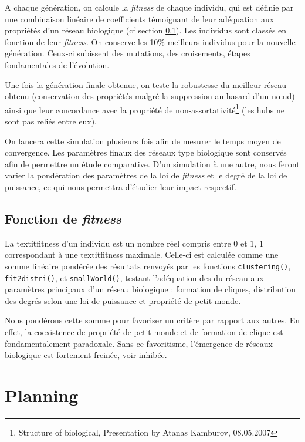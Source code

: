 A chaque génération, on calcule la \textit{fitness} de chaque individu, qui est définie par une combinaison linéaire de coefficients témoignant de leur adéquation aux propriétés d'un réseau biologique (cf section \ref{fitness}).
Les individus sont classés en fonction de leur \textit{fitness}. On conserve les 10\% meilleurs individus pour la nouvelle génération. Ceux-ci subissent des mutations, des croisements, étapes fondamentales de l'évolution.

Une fois la génération finale obtenue, on teste la robustesse du meilleur réseau obtenu (conservation des propriétés malgré la suppression au hasard d'un nœud) ainsi que leur concordance avec la propriété de non-assortativité\footnote{Structure of biological, Presentation by Atanas Kamburov, 08.05.2007} (les hubs ne sont pas reliés entre eux).

On lancera cette simulation plusieurs fois afin de mesurer le temps moyen de convergence.
Les paramètres finaux des réseaux type \og biologique \fg sont conservés afin de permettre un étude comparative. D'un simulation à une autre, nous feront varier la pondération des paramètres de la loi de \textit{fitness} et le degré de la loi de puissance, ce qui nous permettra d'étudier leur impact respectif.

\subsection{Fonction de \textit{fitness}}
\label{fitness}
La textit{fitness} d'un individu est un nombre réel compris entre $0$ et $1$, $1$ correspondant à une textit{fitness} maximale.
Celle-ci est calculée comme une somme linéaire pondérée des résultats renvoyés par les fonctions \texttt{clustering()}, \texttt{fit2distri()}, et \texttt{smallWorld()}, testant l'adéquation des du réseau aux paramètres principaux d'un réseau biologique : formation de cliques, distribution des degrés selon une loi de puissance et propriété de petit monde.

\medskip
Nous pondérons cette somme pour favoriser un critère par rapport aux autres. En effet, la coexistence de propriété de petit monde et de formation de clique est fondamentalement paradoxale. Sans ce favoritisme, l'émergence de réseaux biologique est fortement freinée, voir inhibée.

\section{Planning}
